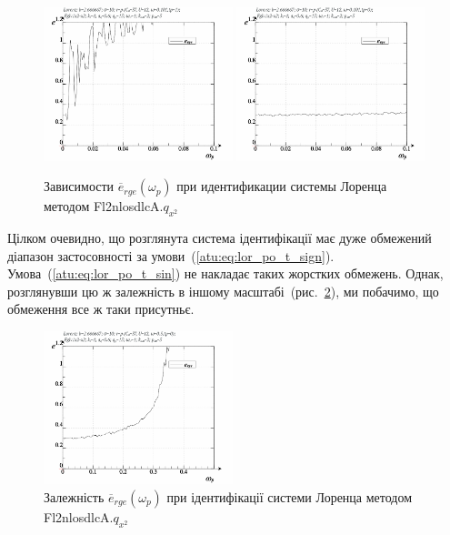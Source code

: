 \begin{figure}[ht!]
  \centerline{
    \includegraphics[width=0.49\textwidth]{p/cha/lor/Fl2nlosdlcA/Fl2nlosdlcA-p_omega_p_e_1.png}
    \hfill
    \includegraphics[width=0.49\textwidth]{p/cha/lor/Fl2nlosdlcA/Fl2nlosdlcA-p_omega_p_e_0.png}
  }
  \caption{Зависимости $\overline{e}_{rge}(\omega_p)$ при идентификации системы Лоренца методом Fl2nlosdlcA.$q_{x^2}$}
  \label{atu:f:lor_Fl2nlosdlcA_e_omega_p}
\end{figure}

Цілком очевидно, що розглянута система ідентифікації
має дуже обмежений діапазон застосовності за
умови~(\ref{atu:eq:lor_po_t_sign}). Умова~(\ref{atu:eq:lor_po_t_sin}) не накладає таких
жорстких обмежень. Однак, розглянувши цю ж залежність в іншому
масштабі~(рис.~\ref{atu:f:lor_Fl2nlosdlcA_e_omega_p_wide}), ми побачимо, що обмеження
все ж таки присутньє.

\begin{figure}[ht!]
  \centerline{
    \includegraphics[width=0.49\textwidth]{p/cha/lor/Fl2nlosdlcA/Fl2nlosdlcA-p_omega_p_e_0_wide.png}
  }
\caption{Залежність $\overline{e}_{rge}(\omega_p) $ при ідентифікації системи Лоренца методом Fl2nlosdlcA.$q_{x^2} $}
\label{atu:f:lor_Fl2nlosdlcA_e_omega_p_wide}
\end{figure}

